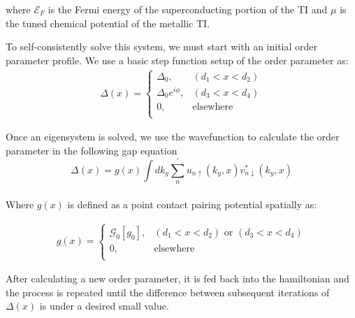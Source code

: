 \documentclass[11pt]{report}
\begin{document}
where 
$\mathcal{E}_F$ is the Fermi energy of the superconducting portion of the TI and $\mu$ is the tuned chemical potential of the metallic TI.


To self-consistently solve this system, we must start with an initial order parameter profile. We use a basic step function setup of the order parameter as: 
\begin{eqnarray}
\Delta(x)=\left\{
\begin{array}{cc}
\Delta_0,&(d_1<x<d_2)\\
\Delta_0 e^{i\phi},& (d_3<x<d_4)\\
0,& \text{elsewhere}\\
\end{array} \right .
\end{eqnarray}

Once an eigensystem is solved, we use the wavefunction to calculate the order parameter in the following gap equation
\begin{equation}
\Delta(x)=g(x)\int  d k_y \sum_n^\prime u_{n\uparrow}(k_y, x)v^*_{n\downarrow}(k_y, x)
\end{equation}\label{gap-eq}
\\
Where $g(x)$ is defined as a point contact pairing potential spatially as:

\begin{eqnarray}
g(x)=\left\{
\begin{array}{cc}
\mathcal{G}_0 [g_0],&(d_1<x<d_2) \text{ or } (d_3<x<d_4)\\
0,& \text{elsewhere}\\
\end{array} \right .
\end{eqnarray}

After calculating a new order parameter, it is fed back into the hamiltonian and the process is repeated until the difference between subsequent iterations of $\Delta(x)$ is under a desired small value.
\end{document}
